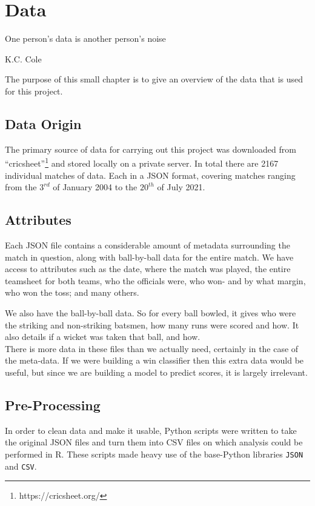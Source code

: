 \chapter{Data}

\epigraph{One person's data is another person's noise}{K.C. Cole}

The purpose of this small chapter is to give an overview of the data that is used for this project.

\section{Data Origin}
The primary source of data for carrying out this project was downloaded from ``cricsheet''\footnote{https://cricsheet.org/}
and stored locally on a private server. In total there are 2167 individual matches of data. Each in a JSON format, 
covering matches ranging from the $3^{rd}$ of January 2004 to the $20^{th}$ of July 2021. \\

\section{Attributes}
Each JSON file contains a considerable amount of metadata surrounding the match in question, along with 
ball-by-ball data for the entire match. We have access to attributes such as the date, where the match was played,
the entire teamsheet for both teams, who the officials were, who won- and by what margin, who won the toss; and many others.

We also have the ball-by-ball data. So for every ball bowled, it gives who were the striking and non-striking batsmen, how many runs
were scored and how. It also details if a wicket was taken that ball, and how. \\

There is more data in these files than we actually need, certainly in the case of the meta-data. If we were building a win classifier then this 
extra data would be useful, but since we are building a model to predict scores, it is largely irrelevant.

\section{Pre-Processing}
In order to clean data and make it usable, Python scripts were written to take the original JSON files and turn them into CSV files on which analysis could 
be performed in R. These scripts made heavy use of the base-Python libraries \verb|JSON| and \verb|CSV|.

